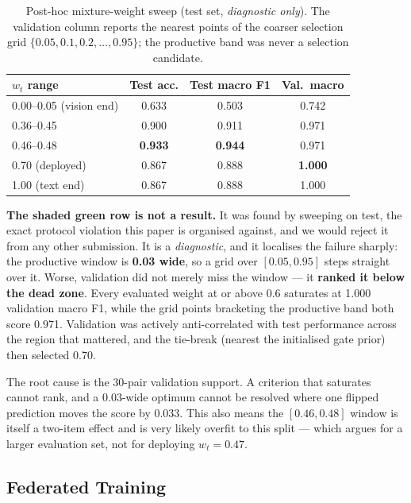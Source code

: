 \documentclass[conference]{IEEEtran}
\begin{document}
\begin{table}[t]
\caption{Post-hoc mixture-weight sweep (test set, \emph{diagnostic only}). The validation column reports the nearest points of the coarser selection grid $\{0.05,0.1,0.2,\ldots,0.95\}$; the productive band was never a selection candidate.}
\label{tab:wsweep}
\centering\footnotesize
\setlength\tabcolsep{4pt}
\begin{tabular}{lccc}
\toprule
\textbf{$w_t$ range} & \textbf{Test acc.} & \textbf{Test macro F1} & \textbf{Val.\ macro}\\
\midrule
0.00--0.05 (vision end) & 0.633 & 0.503 & 0.742\\
0.36--0.45              & 0.900 & 0.911 & 0.971\\
\rowcolor{vitgreen!35}
0.46--0.48              & \textbf{0.933} & \textbf{0.944} & 0.971\\
\rowcolor{vlmred!30}
0.70 (deployed)         & 0.867 & 0.888 & \textbf{1.000}\\
1.00 (text end)         & 0.867 & 0.888 & 1.000\\
\bottomrule
\end{tabular}
\end{table}

\textbf{The shaded green row is not a result.} It was found by sweeping on test,
the exact protocol violation this paper is organised against, and we would reject
it from any other submission. It is a \emph{diagnostic}, and it localises the
failure sharply: the productive window is \textbf{0.03 wide}, so a grid over
$[0.05,0.95]$ steps straight over it. Worse, validation did not merely miss the
window --- it \textbf{ranked it below the dead zone}. Every evaluated weight at or
above 0.6 saturates at 1.000 validation macro F1, while the grid points bracketing
the productive band both score 0.971. Validation was actively anti-correlated with
test performance across the region that mattered, and the tie-break (nearest the
initialised gate prior) then selected 0.70.

The root cause is the 30-pair validation support. A criterion that saturates
cannot rank, and a 0.03-wide optimum cannot be resolved where one flipped
prediction moves the score by 0.033. This also means the $[0.46,0.48]$ window is
itself a two-item effect and is very likely overfit to this split --- which argues
for a larger evaluation set, not for deploying $w_t{=}0.47$.

\subsection{Federated Training}
\label{sec:fedres}
\end{document}

